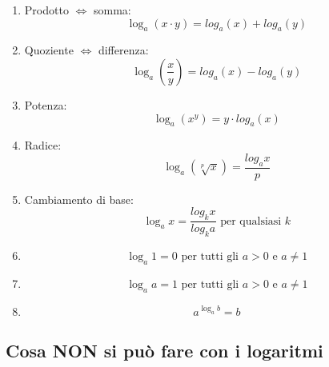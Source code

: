 \begin{minipage}{\textwidth}
\begin{enumerate}

\item Prodotto $\Leftrightarrow$ somma:
\begin{equation*}
\log_a(x\cdot y)=log_a(x) + log_a(y)
\end{equation*}

\item Quoziente $\Leftrightarrow$ differenza:
\begin{equation*}
\log_a\left(\frac{x}{y}\right)=log_a(x) - log_a(y)
\end{equation*}

\item Potenza:
\begin{equation*}
\log_a\left(x^y\right)=y \cdot log_a(x)
\end{equation*}

\item Radice:
\begin{equation*}
\log_a\left(\sqrt[p]{x}\right)=\frac{log_ax}{p}
\end{equation*}

\item Cambiamento di base:
\begin{equation*}
\log_ax=\frac{log_kx}{log_ka}\textrm{ per qualsiasi }k
\end{equation*}


\item 
\begin{equation*}
\log_a1=0\textrm{ per tutti gli }a>0\textrm{ e }a\neq 1
\end{equation*}



\item 
\begin{equation*}
\log_aa=1\textrm{ per tutti gli }a>0\textrm{ e }a\neq 1
\end{equation*}


\item 
\begin{equation*}
a^{\log_ab}=b
\end{equation*}


\end{enumerate}

\end{minipage}

\subsection{Cosa \textbf{NON} si può fare con i logaritmi}

